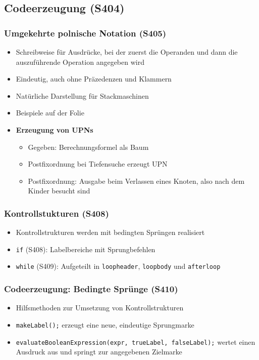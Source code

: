 \subsection{Codeerzeugung (S404)}

\subsubsection{Umgekehrte polnische Notation (S405)}
\begin{itemize}
	\item Schreibweise für Ausdrücke, bei der zuerst die Operanden und dann die auszuführende Operation angegeben wird
	\item Eindeutig, auch ohne Präzedenzen und Klammern
	\item Natürliche Darstellung für Stackmaschinen
	\item Beispiele auf der Folie
	\item \textbf{Erzeugung von UPNs}
	\begin{itemize}
		\item Gegeben: Berechnungsformel als Baum
		\item Postfixordnung bei Tiefensuche erzeugt UPN
		\item Postfixordnung: Ausgabe beim Verlassen eines Knoten, also nach dem Kinder besucht sind
	\end{itemize}
\end{itemize}

\subsubsection{Kontrollstukturen (S408)}
\begin{itemize}
	\item Kontrollstrukturen werden mit bedingten Sprüngen realisiert
	\item \texttt{if} (S408): Labelbereiche mit Sprungbefehlen
	\item \texttt{while} (S409): Aufgeteilt in \texttt{loopheader}, \texttt{loopbody} und \texttt{afterloop}
\end{itemize}

\subsubsection{Codeerzeugung: Bedingte Sprünge (S410)}
\begin{itemize}
	\item Hilfsmethoden zur Umsetzung von Kontrollstrukturen
	\item \texttt{makeLabel();} erzeugt eine neue, eindeutige Sprungmarke
	\item \texttt{evaluateBooleanExpression(expr, trueLabel, falseLabel);} wertet einen Ausdruck aus und springt zur angegebenen Zielmarke
\end{itemize}



